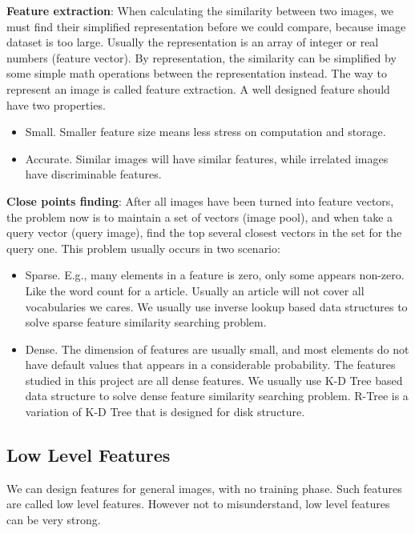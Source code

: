 \documentclass{acm_proc_article-sp}
\begin{document}
\textbf{Feature extraction}: When calculating the similarity between two
images, we must find their simplified representation before we could compare,
because image dataset is too large. Usually the representation is an array of
integer or real numbers (feature vector). By representation, the similarity can
be simplified by some simple math operations between the representation
instead. The way to represent an image is called feature extraction. A well
designed feature should have two properties.
\begin{itemize}
\item Small. Smaller feature size means less stress on computation and storage.
\item Accurate. Similar images will have similar features, while irrelated
        images have discriminable features.
\end{itemize}

\textbf{Close points finding}: After all images have been turned into feature
vectors, the problem now is to maintain a set of vectors (image pool), and when
take a query vector (query image), find the top several closest vectors in the
set for the query one. This problem usually occurs in two scenario:
\begin{itemize}
        \item Sparse. E.g., many elements in a feature is zero, only some
                appears non-zero. Like the word count for a article. Usually an
                article will not cover all vocabularies we cares. We usually
                use inverse lookup based data structures to solve sparse
                feature similarity searching problem.
        \item Dense. The dimension of features are usually small, and most
                elements do not have default values that appears in a
                considerable probability. The features studied in this project
                are all dense features. We usually use K-D Tree based data
                structure to solve dense feature similarity searching problem.
                R-Tree is a variation of K-D Tree that is designed for disk
                structure.
\end{itemize}

\subsection{Low Level Features}

We can design features for general images, with no training phase. Such
features are called low level features. However not to misunderstand, low level
features can be very strong.
\end{document}
